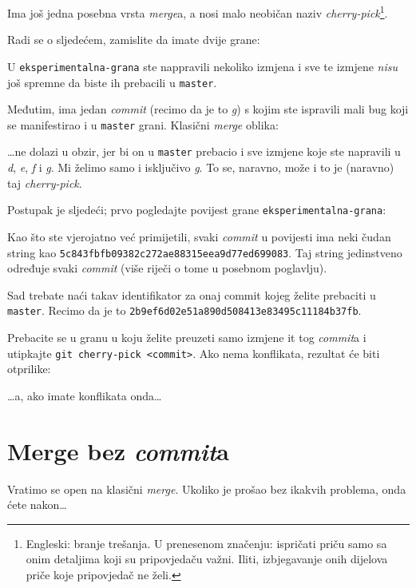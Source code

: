 Ima još jedna posebna vrsta \emph{merge}a, a nosi malo neobičan naziv \emph{cherry-pick}\footnote{Engleski: branje trešanja. U prenesenom značenju: ispričati priču samo sa onim detaljima koji su pripovjedaču važni. Iliti, izbjegavanje onih dijelova priče koje pripovjedač ne želi.}.

Radi se o sljedećem, zamislite da imate dvije grane:



U \verb+eksperimentalna-grana+ ste nappravili nekoliko izmjena i sve te izmjene \emph{nisu} još spremne da biste ih prebacili u \verb+master+.

Međutim, ima jedan \emph{commit} (recimo da je to \emph g) s kojim ste ispravili mali bug koji se manifestirao i u \verb+master+ grani.
Klasični \emph{merge} oblika:



\dots{}ne dolazi u obzir, jer bi on u \verb+master+ prebacio i sve izmjene koje ste napravili u \emph d, \emph e, \emph f i \emph g.
Mi želimo samo i isključivo \emph g.
To se, naravno, može i to je (naravno) taj \emph{cherry-pick}.

Postupak je sljedeći; prvo pogledajte povijest grane \verb+eksperimentalna-grana+:



Kao što ste vjerojatno već primijetili, svaki \emph{commit} u povijesti ima neki čudan string kao \verb+5c843fbfb09382c272ae88315eea9d77ed699083+.
Taj string jedinstveno određuje svaki \emph{commit} (više riječi o tome u posebnom poglavlju).

Sad trebate naći takav identifikator za onaj commit kojeg želite prebaciti u \verb+master+. Recimo da je to \verb+2b9ef6d02e51a890d508413e83495c11184b37fb+.

Prebacite se u granu u koju želite preuzeti samo izmjene it tog \emph{commit}a i utipkajte \verb+git cherry-pick <commit>+.
Ako nema konflikata, rezultat će biti otprilike:



\dots{}a, ako imate konflikata onda\dots

\section*{Merge bez \emph{commit}a}

Vratimo se open na klasični \emph{merge}.
Ukoliko je prošao bez ikakvih problema, onda ćete nakon\dots

